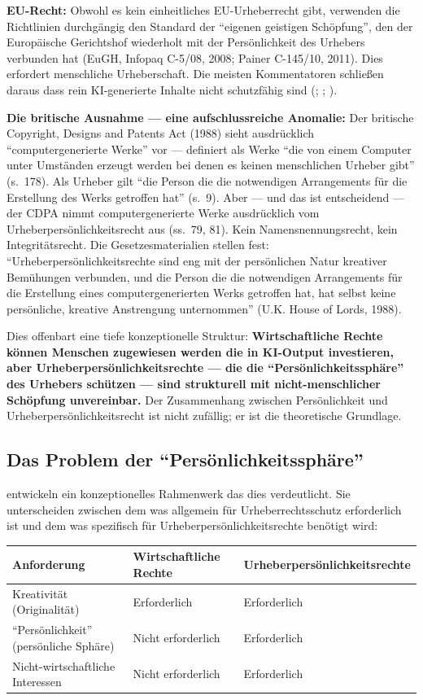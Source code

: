 \documentclass[acmcp, noacm]{acmart}
\begin{document}
\textbf{EU-Recht:} Obwohl es kein einheitliches EU-Urheberrecht gibt, verwenden die Richtlinien durchgängig den Standard der ``eigenen geistigen Schöpfung'', den der Europäische Gerichtshof wiederholt mit der Persönlichkeit des Urhebers verbunden hat (EuGH, Infopaq C-5/08, 2008; Painer C-145/10, 2011). Dies erfordert menschliche Urheberschaft. Die meisten Kommentatoren schließen daraus dass rein KI-generierte Inhalte nicht schutzfähig sind (\cite{handig2009}; \cite{ihalainen2018}; \cite{miernicki2021}).

\textbf{Die britische Ausnahme --- eine aufschlussreiche Anomalie:} Der britische Copyright, Designs and Patents Act (1988) sieht ausdrücklich ``computergenerierte Werke'' vor --- definiert als Werke ``die von einem Computer unter Umständen erzeugt werden bei denen es keinen menschlichen Urheber gibt'' (s.~178). Als Urheber gilt ``die Person die die notwendigen Arrangements für die Erstellung des Werks getroffen hat'' (s.~9). Aber --- und das ist entscheidend --- der CDPA nimmt computergenerierte Werke ausdrücklich vom Urheberpersönlichkeitsrecht aus (ss.~79, 81). Kein Namensnennungsrecht, kein Integritätsrecht. Die Gesetzesmaterialien stellen fest: ``Urheberpersönlichkeitsrechte sind eng mit der persönlichen Natur kreativer Bemühungen verbunden, und die Person die die notwendigen Arrangements für die Erstellung eines computergenerierten Werks getroffen hat, hat selbst keine persönliche, kreative Anstrengung unternommen'' (U.K. House of Lords, 1988).

Dies offenbart eine tiefe konzeptionelle Struktur: \textbf{Wirtschaftliche Rechte können Menschen zugewiesen werden die in KI-Output investieren, aber Urheberpersönlichkeitsrechte --- die die ``Persönlichkeitssphäre'' des Urhebers schützen --- sind strukturell mit nicht-menschlicher Schöpfung unvereinbar.} Der Zusammenhang zwischen Persönlichkeit und Urheberpersönlichkeitsrecht ist nicht zufällig; er ist die theoretische Grundlage.

\subsection{Das Problem der ``Persönlichkeitssphäre''}

\cite{miernicki2021} entwickeln ein konzeptionelles Rahmenwerk das dies verdeutlicht. Sie unterscheiden zwischen dem was allgemein für Urheberrechtsschutz erforderlich ist und dem was spezifisch für Urheberpersönlichkeitsrechte benötigt wird:

\begin{table}[h]
\centering
\begin{tabular}{@{}lll@{}}
\toprule
Anforderung & Wirtschaftliche Rechte & Urheberpersönlichkeitsrechte \\
\midrule
Kreativität (Originalität) & Erforderlich & Erforderlich \\
``Persönlichkeit'' (persönliche Sphäre) & Nicht erforderlich & Erforderlich \\
Nicht-wirtschaftliche Interessen & Nicht erforderlich & Erforderlich \\
\bottomrule
\end{tabular}
\end{table}
\end{document}

